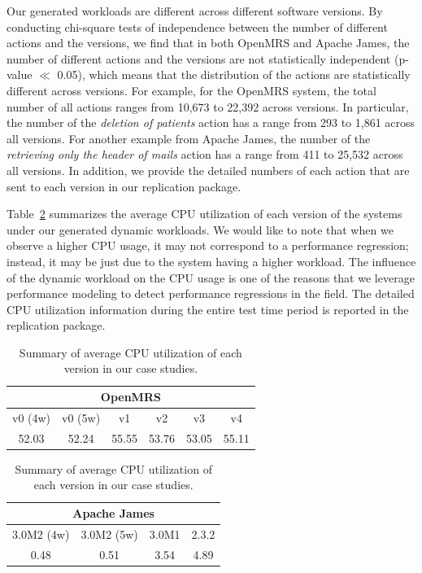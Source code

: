 Our generated workloads are different across different software versions.
By conducting chi-square tests of independence between the number of different actions and the versions, we find that in both OpenMRS and Apache James, the number of different actions and the versions are not statistically independent (p-value $\ll$ 0.05), which means that the distribution of the actions are statistically different across versions. For example, for the OpenMRS system, the total number of all actions ranges from 10,673 to 22,392 across versions. In particular, the number of the \emph{deletion of patients} action has a range from 293 to 1,861 across all versions. For another example from Apache James, the number of the \emph{retrieving only the header of mails} action has a range from 411 to 25,532 across all versions. In addition, we provide the detailed numbers of each action that are sent to each version in our replication package. 




Table~\ref{tab:cpu_utilization} summarizes the average CPU utilization of each version of the systems under our generated dynamic workloads. We would like to note that when we observe a higher CPU usage, it may not correspond to a performance regression; instead, it may be just due to the system having a higher workload. The influence of the dynamic workload on the CPU usage is one of the reasons that we leverage performance modeling to detect performance regressions in the field.
The detailed CPU utilization information during the entire test time period is reported in the replication package.

\begin{table}[tbh]
  \centering
  \footnotesize
  \caption{Summary of average CPU utilization of each version in our case studies.}
 
    \begin{tabular}{c|c|c|c|c|c}
\hline    \multicolumn{6}{c}{OpenMRS} \\
\hline
    v0 (4w) & v0 (5w) & v1    & v2    & v3    & \multicolumn{1}{c}{v4} \\
    \hline
     52.03 & 52.24 & 55.55 & 53.76 & 53.05 & 55.11 \\
    \hline
    \end{tabular}%
\vspace{1em}

    \begin{tabular}{c|c|c|c}
\hline  \multicolumn{4}{c}{ Apache James} \\
\hline
     3.0M2 (4w) & 3.0M2 (5w) & 3.0M1 & 2.3.2 \\
    \hline
     0.48  & 0.51  & 3.54  & 4.89 \\
    \hline
    \end{tabular}%

  \label{tab:cpu_utilization}%
\end{table}%

